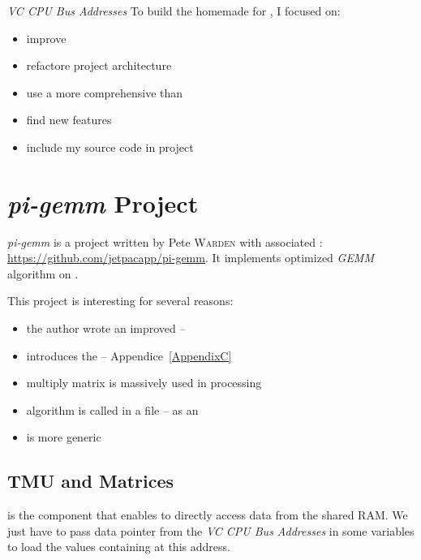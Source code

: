 \emph{VC CPU Bus Addresses}
To build the homemade  for \iBubble, I focused on:
\begin{itemize}
	\item improve 
	\item refactore project architecture
	\item use a more comprehensive  than 
	\item find new \vc{} features
	\item include my source code in  project
\end{itemize}


\section{\emph{pi-gemm} Project}

\emph{pi-gemm} \parencite{refPiGemm} is a project written by Pete \textsc{Warden} with associated : \url{https://github.com/jetpacapp/pi-gemm}. It implements optimized \emph{GEMM} algorithm on \vc.

This project is interesting for several reasons:
\begin{itemize}
	\item the author wrote an improved  -- 
	\item {} introduces the  -- Appendice~\ref{AppendixC}
	\item multiply matrix is massively used in  processing
	\item {} algorithm is called in a  file -- as an 
	\item {}  is more generic
\end{itemize}


\subsection{TMU and Matrices}

 is the \vc{} component that enables \qpu{} to directly access data from the shared RAM. We just have to pass data pointer from the \emph{VC CPU Bus Addresses} in some  variables to load the values containing at this address.

